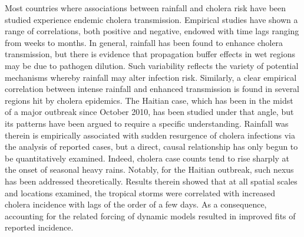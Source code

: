 Most countries where associations between rainfall and cholera risk have been studied experience endemic cholera transmission. Empirical studies have shown a range of correlations, both positive and negative, endowed with time lags ranging from weeks to months. In general, rainfall has been found to enhance cholera transmission, but there is evidence that propagation buffer effects in wet regions may be due to pathogen dilution. Such variability reflects the variety of potential mechanisms whereby rainfall may alter infection risk. Similarly, a clear empirical correlation between intense rainfall and enhanced transmission is found in several regions hit by cholera epidemics. The Haitian case, which has been in the midst of a major outbreak since October 2010, has been studied under that angle, but its patterns have been argued to require a specific understanding. Rainfall was therein is empirically associated with sudden resurgence of cholera infections via the analysis of reported cases, but a direct, causal relationship has only begun to be quantitatively examined. Indeed, cholera case counts tend to rise sharply at the onset of seasonal heavy rains. Notably, for the Haitian outbreak, such nexus has been addressed theoretically. Results therein showed that at all spatial scales and locations examined, the tropical storms were correlated with increased cholera incidence with lags of the order of a few days. As a consequence, accounting for the related forcing of dynamic models resulted in improved fits of reported incidence. 

